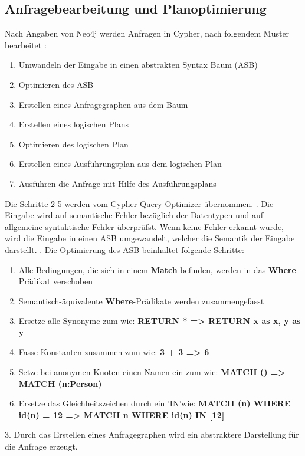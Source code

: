 \subsection{Anfragebearbeitung und Planoptimierung}
Nach Angaben von Neo4j werden Anfragen in Cypher, nach folgendem Muster bearbeitet \parencite{Optimizer}:
\begin{enumerate}
	\item Umwandeln der Eingabe in einen abstrakten Syntax Baum (ASB)
	\item Optimieren des ASB
	\item Erstellen eines Anfragegraphen aus dem Baum
	\item Erstellen eines logischen Plans
	\item Optimieren des logischen Plan 
	\item Erstellen eines Ausführungsplan aus dem logischen Plan
	\item Ausführen die Anfrage mit Hilfe des Ausführungsplans  
\end{enumerate}
Die Schritte 2-5 werden vom Cypher Query Optimizer übernommen. \newline {}. Die Eingabe wird auf semantische Fehler bezüglich der Datentypen und auf allgemeine syntaktische Fehler überprüfst. Wenn keine Fehler erkannt wurde, wird die Eingabe in einen ASB umgewandelt, welcher die Semantik der Eingabe darstellt. \newline
{}. Die Optimierung des ASB beinhaltet folgende Schritte: 
\begin{enumerate}[label=(\roman*)]
	\item Alle Bedingungen, die sich in einem \textbf{Match} befinden, werden in das \textbf{Where}-Prädikat verschoben
	\item  Semantisch-äquivalente \textbf{Where}-Prädikate werden zusammengefasst
	\item Ersetze alle Synonyme zum wie: \textbf{RETURN * => RETURN x as x, y as y}
	\item Fasse Konstanten zusammen zum wie: \textbf{3 + 3 => 6}
	\item Setze bei anonymen Knoten einen Namen ein zum wie: \textbf{ MATCH () => MATCH (n:Person)}
	\item Ersetze das Gleichheitszeichen durch ein 'IN'wie: \textbf{MATCH (n) WHERE id(n) = 12 => MATCH n WHERE id(n) IN [12]}
\end{enumerate}
3. Durch das Erstellen eines Anfragegraphen wird ein abstraktere Darstellung für die Anfrage erzeugt.\newline \newline
